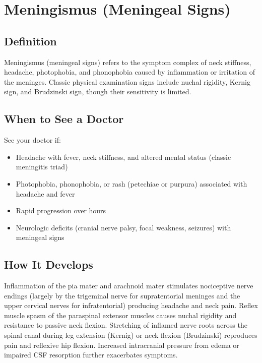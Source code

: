 \chapter{Meningismus (Meningeal Signs)}

\section*{Definition}
Meningismus (meningeal signs) refers to the symptom complex of neck stiffness, headache, photophobia, and phonophobia caused by inflammation or irritation of the meninges. Classic physical examination signs include nuchal rigidity, Kernig sign, and Brudzinski sign, though their sensitivity is limited.

\section*{When to See a Doctor}
See your doctor if:
\begin{itemize}
  \item Headache with fever, neck stiffness, and altered mental status (classic meningitis triad)
  \item Photophobia, phonophobia, or rash (petechiae or purpura) associated with headache and fever
  \item Rapid progression over hours
  \item Neurologic deficits (cranial nerve palsy, focal weakness, seizures) with meningeal signs
\end{itemize}

\section*{How It Develops}
Inflammation of the pia mater and arachnoid mater stimulates nociceptive nerve endings (largely by the trigeminal nerve for supratentorial meninges and the upper cervical nerves for infratentorial) producing headache and neck pain. Reflex muscle spasm of the paraspinal extensor muscles causes nuchal rigidity and resistance to passive neck flexion. Stretching of inflamed nerve roots across the spinal canal during leg extension (Kernig) or neck flexion (Brudzinski) reproduces pain and reflexive hip flexion. Increased intracranial pressure from edema or impaired CSF resorption further exacerbates symptoms.

